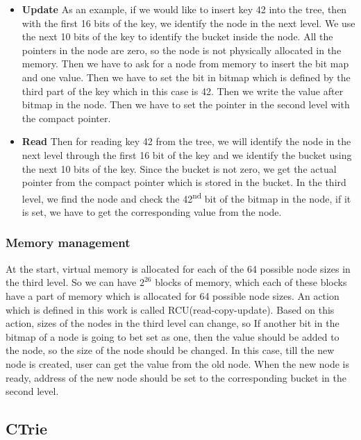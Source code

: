 \documentclass{report}
\begin{document}
\begin{itemize}

\item \textbf{Update} As an example, if we would like to insert key 42 into the tree, then with the first 16 bits of the key, we identify the node in the next level. We use the next 10 bits of the key to identify the bucket inside the node. All the pointers in the node are zero, so the node is not physically allocated in the memory. Then we have to ask for a node from memory to insert the bit map and one value. Then we have to set the bit in bitmap which is defined by the third part of the key which in this case is 42. Then we write the value after bitmap in the node. Then we have to set the pointer in the second level with the compact pointer. 

\item \textbf{Read} Then for reading key 42 from the tree, we will identify the node in the next level through the first 16 bit of the key and we identify the bucket using the next 10 bits of the key. Since the bucket is not zero, we get the actual pointer from the compact pointer which is stored in the bucket. In the third level, we find the node and check the 42\textsuperscript{nd} bit of the bitmap in the node, if it is set, we have to get the corresponding value from the node.

\end{itemize}

\subsubsection{Memory management}

At the start, virtual memory is allocated for each of the 64 possible node sizes in the third level. So we can have ${2}^{26}$ blocks of memory, which each of these blocks have a part of memory which is allocated for 64 possible node sizes. An action which is defined in this work is called RCU(read-copy-update). Based on this action, sizes of the nodes in the third level can change, so If another bit in the bitmap of a node is going to bet set as one, then the value should be added to the node, so the size of the node should be changed. In this case, till the new node is created, user can get the value from the old node. When the new node is ready, address of the new node should be set to the corresponding bucket in the second level.    


\subsection{CTrie\cite{ctrie}}
\end{document}
